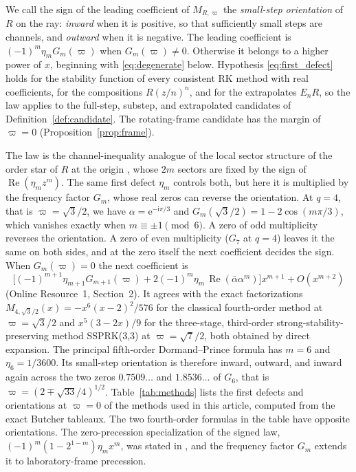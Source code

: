 \documentclass[pdflatex,sn-mathphys-num]{sn-jnl}
\renewcommand{\Re}{\operatorname{Re}}
\newcommand{\e}{\mathrm{e}}
\newcommand{\ii}{\mathrm{i}}
\newcommand{\Mmargin}{M_{R,\varpi}}
\theoremstyle{thmstyleone}
\theoremstyle{thmstylethree}
\theoremstyle{thmstyletwo}
\begin{document}
We call the sign of the leading coefficient of $\Mmargin$ the \emph{small-step orientation} of $R$ on the ray: \emph{inward} when it is positive, so that sufficiently small steps are channels, and \emph{outward} when it is negative. The leading coefficient is $(-1)^m\eta_mG_m(\varpi)$ when $G_m(\varpi)\ne0$. Otherwise it belongs to a higher power of $x$, beginning with \eqref{eq:degenerate} below. Hypothesis \eqref{eq:first_defect} holds for the stability function of every consistent RK method with real coefficients, for the compositions $R(z/n)^n$, and for the extrapolates $E_nR$, so the law applies to the full-step, substep, and extrapolated candidates of Definition~\ref{def:candidate}. The rotating-frame candidate has the margin of $\varpi=0$ (Proposition~\ref{prop:frame}).

The law is the channel-inequality analogue of the local sector structure of the order star of $R$ at the origin \cite{IserlesNorsett1991OrderStars}, whose $2m$ sectors are fixed by the sign of $\Re(\eta_mz^m)$. The same first defect $\eta_m$ controls both, but here it is multiplied by the frequency factor $G_m$, whose real zeros can reverse the orientation. At $q=4$, that is $\varpi=\sqrt3/2$, we have $\alpha=\e^{-\ii\pi/3}$ and $G_m(\sqrt3/2)=1-2\cos(m\pi/3)$, which vanishes exactly when $m\equiv\pm1\pmod 6$. A zero of odd multiplicity reverses the orientation. A zero of even multiplicity ($G_7$ at $q=4$) leaves it the same on both sides, and at the zero itself the next coefficient decides the sign. When $G_m(\varpi)=0$ the next coefficient is
\begin{equation}
 \big[(-1)^{m+1}\eta_{m+1}G_{m+1}(\varpi)+2(-1)^m\eta_m\,\Re(\bar\alpha\alpha^m)\big]x^{m+1}+O(x^{m+2})
 \label{eq:degenerate}
\end{equation}
(Online Resource~1, Section~2). It agrees with the exact factorizations $M_{4,\sqrt3/2}(x)=-x^6(x-2)^2/576$ for the classical fourth-order method at $\varpi=\sqrt3/2$ and $x^5(3-2x)/9$ for the three-stage, third-order strong-stability-preserving method SSPRK(3,3) \cite{GottliebShuTadmor2001} at $\varpi=\sqrt7/2$, both obtained by direct expansion. The principal fifth-order Dormand--Prince formula \cite{DormandPrince1980} has $m=6$ and $\eta_6=1/3600$. Its small-step orientation is therefore inward, outward, and inward again across the two zeros $0.7509\ldots$ and $1.8536\ldots$ of $G_6$, that is $\varpi={(2\mp\sqrt{33}/4)^{1/2}}$. Table~\ref{tab:methods} lists the first defects and orientations at $\varpi=0$ of the methods used in this article, computed from the exact Butcher tableaux. The two fourth-order formulas in the table have opposite orientations. The zero-precession specialization of the signed law, $(-1)^m(1-2^{1-m})\eta_mx^m$, was stated in \cite{PierpointBernardLiu2026Note}, and the frequency factor $G_m$ extends it to laboratory-frame precession.
\end{document}
